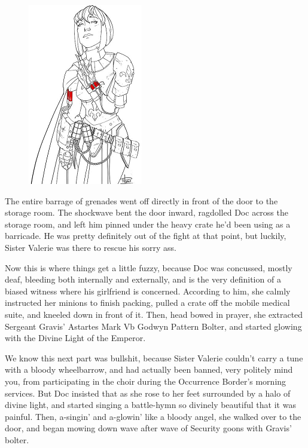 \begin{figure}
	\begin{center}
		\includegraphics[width=\figwidth]{pics/14/36.png}
	\end{center}
\end{figure}
The entire barrage of grenades went off directly in front of the door to the storage room. 
The shockwave bent the door inward, ragdolled Doc across the storage room, and left him pinned under the heavy crate he'd been using as a barricade. 
He was pretty definitely out of the fight at that point, but luckily, Sister Valerie was there to rescue his sorry ass.

Now this is where things get a little fuzzy, because Doc was concussed, mostly deaf, bleeding both internally and externally, and is the very definition of a biased witness where his girlfriend is concerned. 
According to him, she calmly instructed her minions to finish packing, pulled a crate off the mobile medical suite, and kneeled down in front of it. 
Then, head bowed in prayer, she extracted Sergeant Gravis' Astartes Mark Vb Godwyn Pattern Bolter, and started glowing with the Divine Light of the Emperor.

We know this next part was bullshit, because Sister Valerie couldn't carry a tune with a bloody wheelbarrow, and had actually been banned, very politely mind you, from participating in the choir during the Occurrence Border's morning services. 
But Doc insisted that as she rose to her feet surrounded by a halo of divine light, and started singing a battle-hymn so divinely beautiful that it was painful. 
Then, a-singin' and a-glowin' like a bloody angel, she walked over to the door, and began mowing down wave after wave of Security goons with Gravis' bolter.

